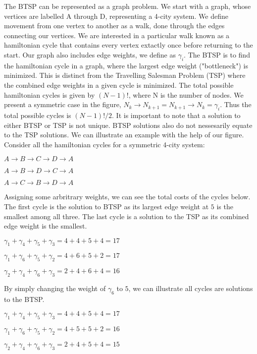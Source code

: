 \documentclass[twocolumn,showpacs,preprintnumbers,amsmath,amssymb]{revtex4}
\begin{document}
		
		The BTSP can be represented as a graph problem.  We start with a graph, whose vertices are labelled A through D, representing a 4-city system. We define movement from one vertex to another as a walk, done through the edges connecting our vertices. We are interested in a particular walk known as a hamiltonian cycle that contains every vertex extactly once before returning to the start. Our graph also includes edge weights, we define as $ \gamma_i $.
		The BTSP is to find the hamiltonian cycle in a graph, where the largest edge weight ("bottleneck") is minimized. This is distinct from the Travelling Salesman Problem (TSP) where the combined edge weights in a given cycle is minimized. The total possible hamiltonian cycles is given by $(N-1)!$, where N is the number of nodes. We present a symmetric case in the figure,  $N_k \rightarrow N_{k+1} = N_{k+1} \rightarrow N_{k} = \gamma_i$. Thus the total possible cycles is  $(N-1)!/2$.  It is important to note that a solution to either BTSP or TSP is not unique. BTSP solutions also do not nessesarily equate to the TSP solutions. We can illustrate an example with the help of our figure. Consider all the hamiltonian cycles for a symmetric 4-city system:
		\begin{center}
		$ A \rightarrow B \rightarrow C \rightarrow D \rightarrow A $
		
		$ A \rightarrow B \rightarrow D \rightarrow C \rightarrow A $ 
		
		$ A \rightarrow C \rightarrow B \rightarrow D \rightarrow A $
	    \end{center}
		
		Assigning some arbritrary weights, we can see the total costs of the cycles below. The first cycle is the solution to BTSP as its largest edge weight at $5$ is the smallest among all three. The last cycle is a solution to the TSP as its combined edge weight is the smallest.
		\begin{center}
		$\gamma_1 + \gamma_4 + \gamma_5 + \gamma_3 = 4 + 4 + 5 + 4 = 17$
		
		$ \gamma_1 + \gamma_6 + \gamma_5 + \gamma_2 = 4 + 6 + 5 + 2 = 17$
		
		$  \gamma_2 + \gamma_4 + \gamma_6 + \gamma_3 = 2 + 4 + 6 + 4 = 16$
		\end{center}
		

		By simply changing the weight of $\gamma_6$ to $5$, we can illustrate all cycles are solutions to the BTSP. 
		
		\begin{center}

			$\gamma_1 + \gamma_4 + \gamma_5 + \gamma_3 = 4 + 4 + 5 + 4 = 17$
			
			$ \gamma_1 + \gamma_6 + \gamma_5 + \gamma_2 = 4 + 5 + 5 + 2 = 16$
			
			$  \gamma_2 + \gamma_4 + \gamma_6 + \gamma_3 = 2 + 4 + 5 + 4 = 15$
		\end{center}
		
\end{document}
